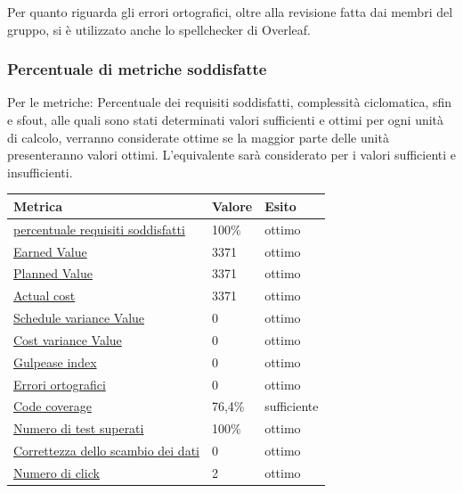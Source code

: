 Per quanto riguarda gli errori ortografici, oltre alla revisione fatta dai membri del gruppo, si è utilizzato anche lo spellchecker di Overleaf.

\subsubsection{Percentuale di metriche soddisfatte}
    Per le metriche: Percentuale dei requisiti soddisfatti, complessità ciclomatica, sfin e sfout, alle quali sono stati determinati valori sufficienti e ottimi per ogni unità di calcolo,
    verranno considerate ottime se la maggior parte delle unità presenteranno valori ottimi. L'equivalente
    sarà considerato per i valori sufficienti e insufficienti. 


    \begin{longtabu} to \textwidth {| X[0.2,c m] | X[0.1,c m] | X[0.1,c m] |}
        \hline
        \textbf{Metrica} &
        \textbf{Valore} &
        \textbf{Esito}\\
        \hline
        \hyperlink{subsubsection.5.1.1}{percentuale requisiti soddisfatti}& 100\% & ottimo \\ 
        \hline
        \hyperlink{subsubsection.5.1.2}{Earned Value} & 3371 & ottimo  \\ 
        \hline
        \hyperlink{subsubsection.5.1.2}{Planned Value} & 3371 & ottimo  \\
        \hline
        \hyperlink{subsubsection.5.1.2}{Actual cost} & 3371 & ottimo  \\
        \hline
        \hyperlink{subsubsection.5.1.2}{Schedule variance Value} & 0 & ottimo  \\
        \hline
        \hyperlink{subsubsection.5.1.2}{Cost variance Value} & 0 & ottimo  \\
        \hline
        \hyperlink{subsubsection.5.2.1}{Gulpease index} & 0 & ottimo  \\
        \hline
        \hyperlink{subsubsection.5.2.2}{Errori ortografici} & 0 & ottimo  \\
        \hline
        \hyperlink{subsubsection.5.2.4}{Code coverage} & 76,4\% & sufficiente \\
        \hline
        \hyperlink{subsubsection.5.2.5}{Numero di test superati} & 100\% & ottimo \\
        \hline
        \hyperlink{subsubsection.5.3.1}{Correttezza dello scambio dei dati} & 0 & ottimo \\
        \hline
        \hyperlink{subsubsection.5.3.2}{Numero di click} & 2 & ottimo \\

\end{longtabu}
